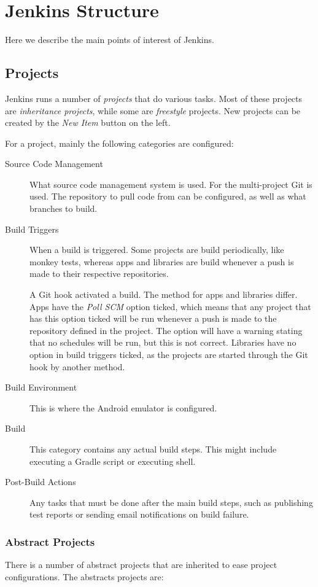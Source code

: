\chapter{Jenkins Structure}\label{app:jenkins_structure}
Here we describe the main points of interest of Jenkins.

\section{Projects}
Jenkins runs a number of \emph{projects} that do various tasks. Most of these projects are \emph{inheritance projects}, while some are \emph{freestyle} projects. New projects can be created by the \emph{New Item} button on the left.

For a project, mainly the following categories are configured:

\begin{description}
  \item[Source Code Management] What source code management system is used. For the multi-project Git is used. The repository to pull code from can be configured, as well as what branches to build.
  \item[Build Triggers] When a build is triggered. Some projects are build periodically, like monkey tests, whereas apps and libraries are build whenever a push is made to their respective repositories.

  A Git hook activated a build. The method for apps and libraries differ. Apps have the \emph{Poll SCM} option ticked, which means that any project that has this option ticked will be run whenever a push is made to the repository defined in the project. The option will have a warning stating that no schedules will be run, but this is not correct. Libraries have no option in build triggers ticked, as the projects are started through the Git hook by another method.
  \item[Build Environment] This is where the Android emulator is configured.
  \item[Build] This category contains any actual build steps. This might include executing a Gradle script or executing shell.
  \item[Post-Build Actions] Any tasks that must be done after the main build steps, such as publishing test reports or sending email notifications on build failure.
\end{description}

\subsection{Abstract Projects}
There is a number of abstract projects that are inherited to ease project configurations. The abstracts projects are:

